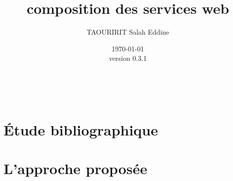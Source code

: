 \documentclass[a4paper, oneside, 12pt]{report}
\author{TAOURIRIT Salah Eddine}
\title{composition des services web}
\date{\today\\version 0.3.1}
\begin{document}
\let\Item\item \newcommand{\head}[1]{\textnormal{\textbf{#1}}}

\newcommand\SpecialItem{\renewcommand\item[1][]{\Item[\hspace{0.5cm}\textbullet~\sffamily
    ##1]} }

\newcommand\SpecialItemI{\renewcommand\item[1][]{\Item[\textendash~\sffamily
    ##1]}}

\renewcommand{\descriptionlabel}[1]{\hspace{0.5cm}\textbullet~\textsf{#1}}
\renewcommand\enddescription{\endlist\global\let\item\Item}

\renewcommand{\thesubsubsection}{} %
\newtheorem{mydef}{Definition}

\captionsetup[figure]{name=Figure.}
\captionsetup[table]{name=Table.}

\maketitle

\setcounter{secnumdepth}{4}
\setcounter{tocdepth}{2}

\tableofcontents

\printglossaries\
\listoffigures
\listoftables

\newpage
{}


\part{Étude bibliographique}


\part{L'approche proposée}






\begin{appendices}


\end{appendices}
\end{document}
